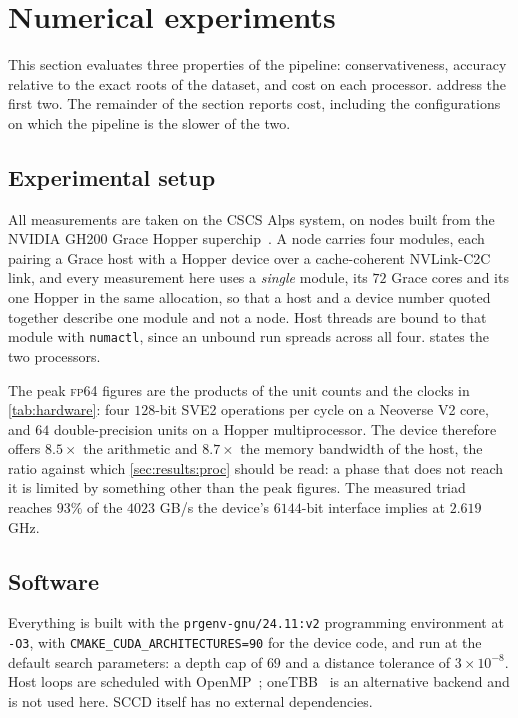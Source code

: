 \section{Numerical experiments}
\label{sec:results}

This section evaluates three properties of the pipeline: conservativeness,
accuracy relative to the exact roots of the dataset, and cost on each processor.
 address the first two. The remainder of
the section reports cost, including the configurations on which the pipeline is
the slower of the two.

\subsection{Experimental setup}
\label{sec:results:setup}

All measurements are taken on the CSCS Alps system, on nodes built from the
\textsc{NVIDIA GH200} Grace Hopper superchip~\citep{nvidia2023gh200}. A node
carries four modules, each pairing a Grace host with a Hopper device over a
cache-coherent NVLink-C2C link, and every measurement here uses a \emph{single}
module, its $72$ Grace cores and its one Hopper in the same allocation, so that
a host and a device number quoted together describe one module and not a node.
Host threads are bound to that module with \texttt{numactl}, since an unbound
run spreads across all four.  states the two processors.



The peak \textsc{fp64} figures are the products of the unit counts and the clocks
in \cref{tab:hardware}: four $128$-bit SVE2 operations per cycle on a Neoverse
V2 core, and $64$ double-precision units on a Hopper multiprocessor. The device
therefore offers $8.5\times$ the arithmetic and $8.7\times$ the memory bandwidth
of the host, the ratio against which \cref{sec:results:proc} should be read: a
phase that does not reach it is limited by something other than the peak
figures. The measured triad reaches $93\%$ of the $4023$ GB/s the device's
$6144$-bit interface implies at $2.619$ GHz.

\subsection{Software}
\label{sec:results:software}

Everything is built with the \texttt{prgenv-gnu/24.11:v2} programming
environment at \texttt{-O3}, with \texttt{CMAKE\_CUDA\_ARCHITECTURES=90} for the
device code, and run at the default search parameters: a depth cap of $69$ and a
distance tolerance of $3\times10^{-8}$. Host loops are scheduled with
OpenMP~\citep{dagum1998openmp}; oneTBB~\citep{onetbb} is an alternative backend
and is not used here. SCCD itself has no external dependencies.

